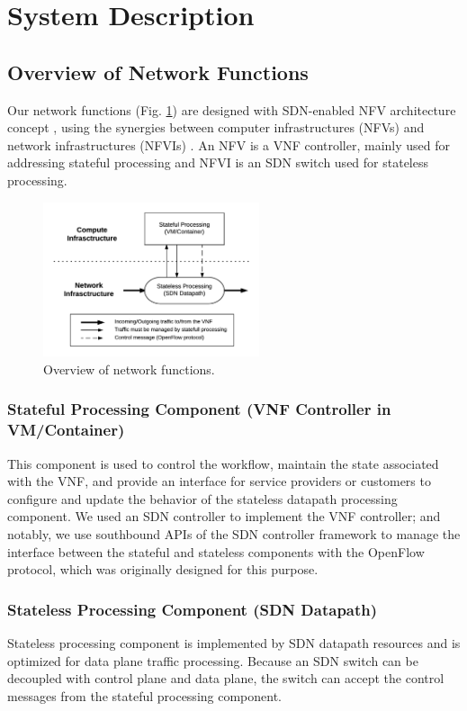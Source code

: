 \documentclass[journal]{IEEEtran}
\begin{document}
\section{System Description}
\subsection{Overview of Network Functions} \label{ssec:desc_nfv_overview}
Our network functions (Fig. \ref{fig:desc_nfv_overview}) are designed with SDN-enabled NFV architecture concept \cite{sdn-enabled}, using the synergies between computer infrastructures (NFVs) and network infrastructures (NFVIs) \cite{nfv2014-v121, nfv2015}.
An NFV is a VNF controller, mainly used for addressing stateful processing and NFVI is an SDN switch used for stateless processing.

\begin{figure}[!t]
\centering
\includegraphics[width=2.5in]{./figures/desc_nfv_overview}
\caption{Overview of network functions.}
\label{fig:desc_nfv_overview}
\end{figure}

\subsubsection{Stateful Processing Component (VNF Controller in VM/Container)}
This component is used to control the workflow, maintain the state associated with the VNF, and provide an interface for service providers or customers to configure and update the behavior of the stateless datapath processing component. We used an SDN controller to implement the VNF controller; and notably, we use southbound APIs of the SDN controller framework to manage the interface between the stateful and stateless components with the OpenFlow protocol, which was originally designed for this purpose.

\subsubsection{Stateless Processing Component (SDN Datapath)}
Stateless processing component is implemented by SDN datapath resources and is optimized for data plane traffic processing. Because an SDN switch can be decoupled with control plane and data plane, the switch can accept the control messages from the stateful processing component.
\end{document}
